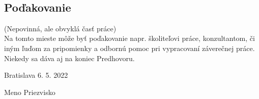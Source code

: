 
\
\vfill

\subsection*{Poďakovanie}

(Nepovinná, ale obvyklá časť práce)\\

Na tomto mieste môže byť poďakovanie napr. školiteľovi práce, konzultantom, či iným ľuďom za pripomienky a odbornú pomoc pri vypracovaní záverečnej práce. Niekedy sa dáva aj na koniec Predhovoru.

\vspace{10pt}

\noindent Bratislava 6. 5. 2022 \hfil
\newline
\begin{flushright}
	Meno Priezvisko $\qquad$
\end{flushright}
